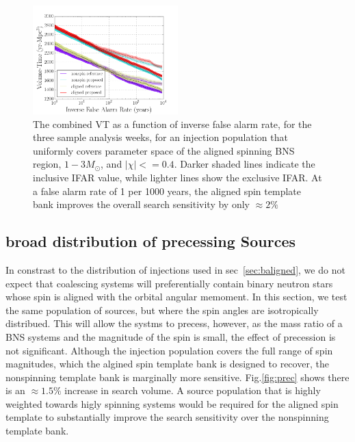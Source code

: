 \begin{figure}
\centering
\includegraphics[width=0.5\textwidth]{papers/bns_o1_dev/figures/aligned_combined.png}
\caption{\label{fig:aligned} 
The combined VT as a function of inverse false alarm rate, for the
three sample analysis weeks, for an injection population that uniformly covers parameter space of the aligned spinning BNS region, $1- 3M_\odot$, and $|\chi| <= 0.4$. Darker shaded lines indicate the inclusive IFAR value, while lighter lines show the exclusive IFAR. At a false alarm rate of 1 per 1000 years, the aligned spin template bank improves the overall search sensitivity by only $\approx 2\%$
}
\end{figure}

\subsection{broad distribution of precessing Sources}

In constrast to the distribution of injections used in sec~\ref{sec:baligned}, we do not expect that coalescing systems will preferentially contain binary neutron stars whose spin is aligned with the orbital angular memoment. In this section, we test the same population of sources, but where the spin angles are isotropically distribued. This will allow the systms to precess, however, as the mass ratio of a BNS systems and the magnitude of the spin is small, the effect of precession is not significant. Although the injection population covers the full range of spin magnitudes, which the algined spin template bank is designed to recover, the nonspinning template bank is marginally more sensitive. Fig.\ref{fig:prec} shows there is an $\approx 1.5\%$ increase in search volume. A source population that is highly weighted towards higly spinning systems would be required for the aligned spin template to substantially improve the search sensitivity over the nonspinning template bank. 

